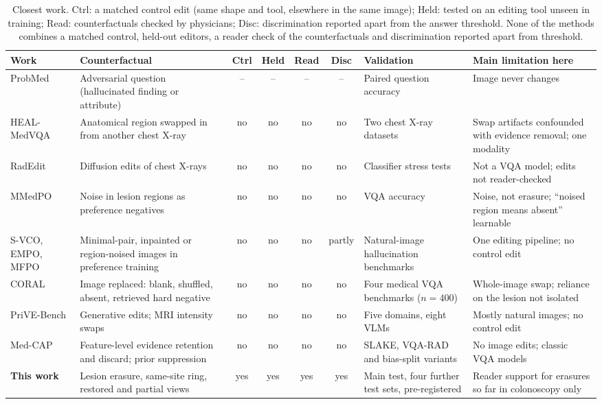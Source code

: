 \documentclass[5p,times,twocolumn,authoryear]{elsarticle}
\begin{document}
\begin{table}[!t]
\caption{Closest work. Ctrl: a matched control edit (same shape and tool, elsewhere in the same image); Held: tested on an editing tool unseen in training; Read: counterfactuals checked by physicians; Disc: discrimination reported apart from the answer threshold. None of the methods combines a matched control, held-out editors, a reader check of the counterfactuals and discrimination reported apart from threshold.}
\label{tab:related}
\begin{center}
\scriptsize
\setlength{\tabcolsep}{3pt}
\begin{adjustbox}{max width=\linewidth}
\begin{tabular}{L{2.2cm}L{2.9cm}cccc L{2.0cm}L{2.6cm}}
\toprule
\textbf{Work} & \textbf{Counterfactual} & \textbf{Ctrl} & \textbf{Held} & \textbf{Read} & \textbf{Disc} & \textbf{Validation} & \textbf{Main limitation here} \\
\midrule
ProbMed \citep{yan2024probmed} & Adversarial question (hallucinated finding or attribute) & -- & -- & -- & -- & Paired question accuracy & Image never changes \\
HEAL-MedVQA \citep{healmedvqa2024} & Anatomical region swapped in from another chest X-ray & no & no & no & no & Two chest X-ray datasets & Swap artifacts confounded with evidence removal; one modality \\
RadEdit \citep{perez2024radedit} & Diffusion edits of chest X-rays & no & no & no & no & Classifier stress tests & Not a VQA model; edits not reader-checked \\
MMedPO \citep{zhu2024mmedpo} & Noise in lesion regions as preference negatives & no & no & no & no & VQA accuracy & Noise, not erasure; ``noised region means absent'' learnable \\
S-VCO, EMPO, MFPO \citep{svco2024,wu2025empo,jiang2025mfpo} & Minimal-pair, inpainted or region-noised images in preference training & no & no & no & partly & Natural-image hallucination benchmarks & One editing pipeline; no control edit \\
CORAL \citep{zafar2026coral} & Image replaced: blank, shuffled, absent, retrieved hard negative & no & no & no & no & Four medical VQA benchmarks ($n = 400$) & Whole-image swap; reliance on the lesion not isolated \\
PriVE-Bench \citep{sun2026prive} & Generative edits; MRI intensity swaps & no & no & no & no & Five domains, eight VLMs & Mostly natural images; no control edit \\
Med-CAP \citep{huang2026medcap} & Feature-level evidence retention and discard; prior suppression & no & no & no & no & SLAKE, VQA-RAD and bias-split variants & No image edits; classic VQA models \\
\textbf{This work} & Lesion erasure, same-site ring, restored and partial views & yes & yes & yes & yes & Main test, four further test sets, pre-registered & Reader support for erasures so far in colonoscopy only \\
\bottomrule
\end{tabular}
\end{adjustbox}
\end{center}
\end{table}
\end{document}
